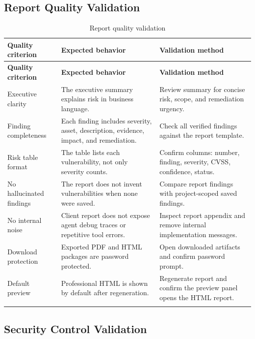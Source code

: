 \documentclass[12pt,a4paper]{report}
\begin{document}
\subsection{Report Quality Validation}

\begin{longtable}{|p{}|p{}|p{}|}
\hline
\textbf{Quality criterion} & \textbf{Expected behavior} & \textbf{Validation
method} \\
\hline
\endfirsthead
\hline
\textbf{Quality criterion} & \textbf{Expected behavior} & \textbf{Validation
method} \\
\hline
\endhead
Executive clarity & The executive summary explains risk in business language. &
Review summary for concise risk, scope, and remediation urgency. \\
\hline
Finding completeness & Each finding includes severity, asset, description,
evidence, impact, and remediation. & Check all verified findings against the
report template. \\
\hline
Risk table format & The table lists each vulnerability, not only severity counts.
& Confirm columns: number, finding, severity, CVSS, confidence, status. \\
\hline
No hallucinated findings & The report does not invent vulnerabilities when none
were saved. & Compare report findings with project-scoped saved findings. \\
\hline
No internal noise & Client report does not expose agent debug traces or repetitive
tool errors. & Inspect report appendix and remove internal implementation
messages. \\
\hline
Download protection & Exported PDF and HTML packages are password protected. &
Open downloaded artifacts and confirm password prompt. \\
\hline
Default preview & Professional HTML is shown by default after regeneration. &
Regenerate report and confirm the preview panel opens the HTML report. \\
\hline
\caption{Report quality validation}
\label{tab:report_quality_validation}
\end{longtable}

\subsection{Security Control Validation}
\end{document}
